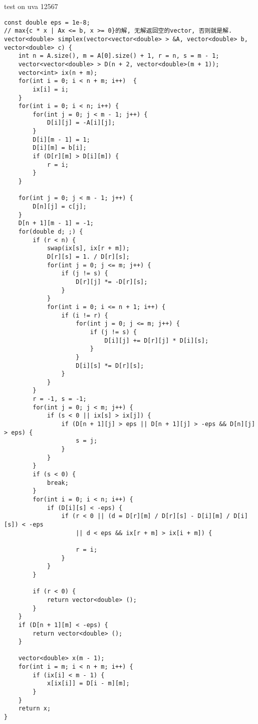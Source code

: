 test on uva 12567
\begin{lstlisting}
const double eps = 1e-8;
// max{c * x | Ax <= b, x >= 0}的解, 无解返回空的vector, 否则就是解. 
vector<double> simplex(vector<vector<double> > &A, vector<double> b, vector<double> c) {
	int n = A.size(), m = A[0].size() + 1, r = n, s = m - 1;
	vector<vector<double> > D(n + 2, vector<double>(m + 1));
	vector<int> ix(n + m);
	for(int i = 0; i < n + m; i++)  {
		ix[i] = i;
	}
	for(int i = 0; i < n; i++) {
		for(int j = 0; j < m - 1; j++) {
			D[i][j] = -A[i][j];
		}
		D[i][m - 1] = 1;
		D[i][m] = b[i];
		if (D[r][m] > D[i][m]) {
			r = i;
		}
	}
 
	for(int j = 0; j < m - 1; j++) {
		D[n][j] = c[j];
	}
	D[n + 1][m - 1] = -1;
	for(double d; ;) {
		if (r < n) {
			swap(ix[s], ix[r + m]);
			D[r][s] = 1. / D[r][s];
			for(int j = 0; j <= m; j++) {
				if (j != s) {
					D[r][j] *= -D[r][s];
				}
			}
			for(int i = 0; i <= n + 1; i++) {
				if (i != r) {
					for(int j = 0; j <= m; j++) {
						if (j != s) {
							D[i][j] += D[r][j] * D[i][s];
						}
					}
					D[i][s] *= D[r][s];
				}
			}
		}
		r = -1, s = -1;
		for(int j = 0; j < m; j++) {
			if (s < 0 || ix[s] > ix[j]) {
				if (D[n + 1][j] > eps || D[n + 1][j] > -eps && D[n][j] > eps) {
					s = j;
				}
			}
		}
		if (s < 0) {
			break;
		}
		for(int i = 0; i < n; i++) {
			if (D[i][s] < -eps) {
				if (r < 0 || (d = D[r][m] / D[r][s] - D[i][m] / D[i][s]) < -eps
					|| d < eps && ix[r + m] > ix[i + m]) {
 
					r = i;
				}
			}
		}
 
		if (r < 0) {
			return vector<double> ();
		}
	}
	if (D[n + 1][m] < -eps) {
		return vector<double> ();
	}
 
	vector<double> x(m - 1);
	for(int i = m; i < n + m; i++) {
		if (ix[i] < m - 1) {
			x[ix[i]] = D[i - m][m];
		}
	}
	return x;
}
\end{lstlisting}
